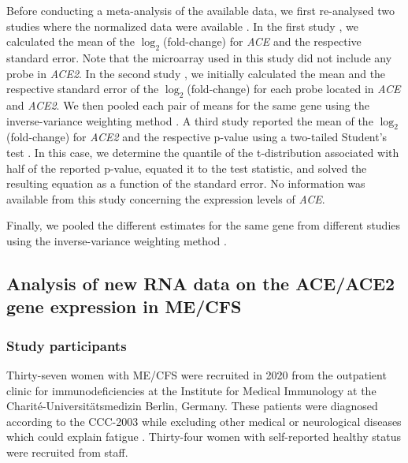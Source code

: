 Before conducting a meta-analysis of the available data, we first re-analysed two studies where the normalized data were available \citep{saikiIdentificationMarkerGenes2008, gowGeneSignaturePostinfectious2009}. In the first study \citep{saikiIdentificationMarkerGenes2008}, we calculated the mean of the {$\log_{2}$}(fold-change) for \textit{ACE} and the respective standard error. Note that the microarray used in this study did not include any probe in \textit{ACE2}. In the second study \citep{gowGeneSignaturePostinfectious2009}, we initially calculated the mean and the respective standard error of the {$\log_{2}$}(fold-change) for each probe located in \textit{ACE} and \textit{ACE2}. We then pooled each pair of means for the same gene using the inverse-variance weighting method \citep{hartung2008StatisticalMeta}. A third study reported the mean of the {$\log_{2}$}(fold-change) for \textit{ACE2} and the respective p-value using a two-tailed Student's test \citep{smithConvergentGenomicStudies2011}. In this case, we determine the quantile of the t-distribution associated with half of the reported p-value, equated it to the test statistic, and solved the resulting equation as a function of the standard error. No information was available from this study concerning the expression levels of \textit{ACE}.

Finally, we pooled the different estimates for the same gene from different studies using the inverse-variance weighting method \citep{hartung2008StatisticalMeta}.

\subsection{Analysis of new RNA data on the ACE/ACE2 gene expression in ME/CFS}

\subsubsection{Study participants}

Thirty-seven women with ME/CFS were recruited in 2020 from the outpatient clinic for immunodeficiencies at the Institute for Medical Immunology at the Charité-Universitätsmedizin Berlin, Germany. These patients were diagnosed according to the CCC-2003 while excluding other medical or neurological diseases which could explain fatigue \citep{carruthers2003MyalgicEncephalomyelitis}. Thirty-four women with self-reported healthy status were recruited from staff.

